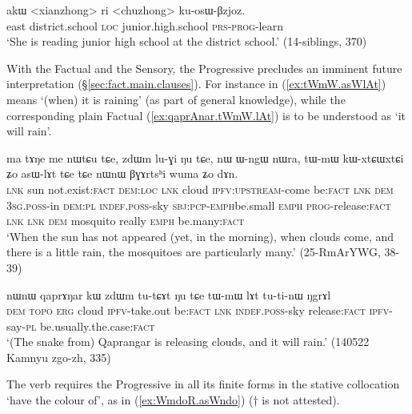 \begin{exe}
\ex \label{ex:kosWBzjoz}
\gll  akɯ <xianzhong> ri <chuzhong> ku-osɯ-βzjoz. \\
east district.school \textsc{loc} junior.high.school \textsc{prs}-\textsc{prog}-learn \\
\glt `She is reading junior high school at the district school.' (14-siblings, 370)
 \end{exe}

With the Factual and the Sensory, the Progressive precludes an imminent future interpretation (§\ref{sec:fact.main.clauses}).  For instance  in (\ref{ex:tWmW.asWlAt}) means `(when) it is raining' (as part of general knowledge), while the corresponding plain Factual  (\ref{ex:qaprAnar.tWmW.lAt}) is to be understood as `it will rain'.


\begin{exe}
\ex \label{ex:tWmW.asWlAt}
\gll ma tɤŋe me nɯtɕu tɕe, zdɯm lu-ɣi ŋu tɕe, nɯ ɯ-ngɯ nɯra, tɯ-mɯ kɯ-xtɕɯ\redp{}xtɕi ʑo asɯ-lɤt tɕe tɕe nɯnɯ βɣɤrtsʰi wuma ʑo dɤn. \\
\textsc{lnk} sun not.exist:\textsc{fact} \textsc{dem}:\textsc{loc} \textsc{lnk} cloud \textsc{ipfv}:\textsc{upstream}-come be:\textsc{fact} \textsc{lnk} \textsc{dem} \textsc{3sg}.\textsc{poss}-in \textsc{dem}:\textsc{pl} \textsc{indef}.\textsc{poss}-sky \textsc{sbj}:\textsc{pcp}-\textsc{emph}\redp{}be.small \textsc{emph} \textsc{prog}-release:\textsc{fact} \textsc{lnk} \textsc{lnk} \textsc{dem} mosquito really \textsc{emph} be.many:\textsc{fact} \\
\glt  `When the sun has not appeared (yet, in the morning), when clouds come, and there is a little rain, the mosquitoes are particularly many.' (25-RmArYWG, 38-39)
\end{exe}
 
\begin{exe}
\ex \label{ex:qaprAnar.tWmW.lAt}
\gll nɯnɯ qaprɤŋar kɯ zdɯm tu-tɕɤt ŋu tɕe tɯ-mɯ lɤt tu-ti-nɯ ŋgrɤl \\
\textsc{dem}  \textsc{topo} \textsc{erg} cloud \textsc{ipfv}-take.out be:\textsc{fact} \textsc{lnk} \textsc{indef}.\textsc{poss}-sky release:\textsc{fact} \textsc{ipfv}-say-\textsc{pl} be.usually.the.case:\textsc{fact} \\
\glt `(The snake from) Qaprangar is releasing clouds, and it will rain.' (140522 Kamnyu zgo-zh, 335)
\end{exe}

The verb  requires the Progressive in all its finite forms in the stative collocation  `have the colour of', as in (\ref{ex:WmdoR.asWndo}) ($\dagger$ is not attested).

